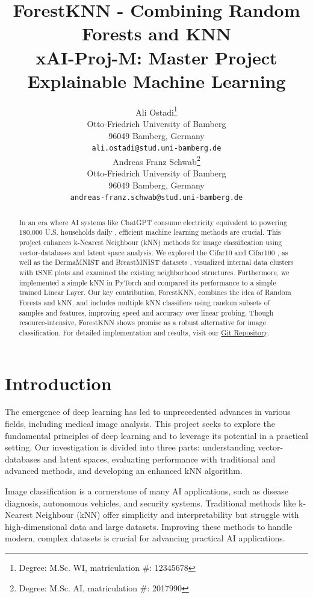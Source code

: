 \documentclass[a4paper]{article}
\title{ForestKNN - Combining Random Forests and KNN\\ {\large xAI-Proj-M: Master Project Explainable Machine Learning }}
\author{%
  Ali Ostadi\thanks{Degree: M.Sc. WI, matriculation \#: 12345678} \\
  Otto-Friedrich University of Bamberg\\
  96049 Bamberg, Germany\\
  \texttt{ali.ostadi@stud.uni-bamberg.de}\\
   \And
   Andreas Franz Schwab\thanks{Degree: M.Sc. AI, matriculation \#: 2017990}\\
   Otto-Friedrich University of Bamberg\\
   96049 Bamberg, Germany\\
   \texttt{andreas-franz.schwab@stud.uni-bamberg.de} \\
}
\begin{document}
\maketitle
\def\va{{\bm{a}}}

\begin{abstract}
  In an era where AI systems like ChatGPT consume electricity equivalent to powering 180,000 U.S. households daily \citep{Gordon2024}, efficient machine learning methods are crucial. This project enhances k-Nearest Neighbour (kNN) methods for image classification using vector-databases and latent space analysis. We explored the Cifar10 and Cifar100 \citep{Krizhevsky2009}, as well as the DermaMNIST and BreastMNIST datasets \citep{medmnistv1, medmnistv2}, visualized internal data clusters with tSNE plots and examined the existing neighborhood structures. Furthermore, we implemented a simple kNN in PyTorch and compared its performance to a simple trained Linear Layer.
  Our key contribution, ForestKNN, combines the idea of Random Forests and kNN, and includes multiple kNN classifiers using random subsets of samples and features, improving speed and accuracy over linear probing. Though resource-intensive, ForestKNN shows promise as a robust alternative for image classification. For detailed implementation and results, visit our \href{https://github.com/git2andi/xAI_Proj_M}{Git Repository}.
  
\end{abstract}


\section{Introduction}\label{introduction}
The emergence of deep learning has led to unprecedented advances in various fields, including medical image analysis. This project seeks to explore the fundamental principles of deep learning and to leverage its potential in a practical setting. Our investigation is divided into three parts: understanding vector-databases and latent spaces, evaluating performance with traditional and advanced methods, and developing an enhanced kNN algorithm.

Image classification is a cornerstone of many AI applications, such as disease diagnosis, autonomous vehicles, and security systems. Traditional methods like k-Nearest Neighbour (kNN) offer simplicity and interpretability but struggle with high-dimensional data and large datasets. Improving these methods to handle modern, complex datasets is crucial for advancing practical AI applications.
\end{document}
